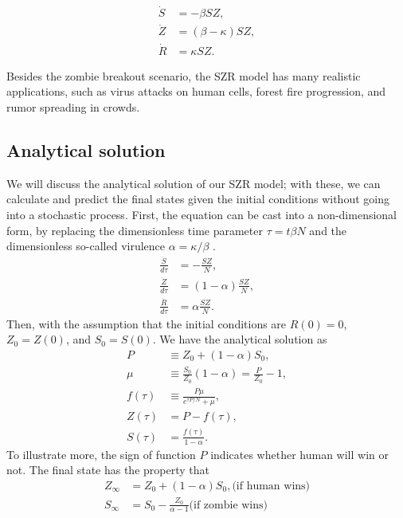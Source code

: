 \documentclass[11pt]{article}
\begin{document}
\begin{align}
    \dot{S} & = -\beta SZ,        \\
    \dot{Z} & = (\beta-\kappa)SZ, \\
    \dot{R} & = \kappa SZ.
\end{align}

Besides the zombie breakout scenario, the SZR model has many realistic applications, such as virus attacks on human cells, forest fire progression, and rumor spreading in crowds.

\subsection{Analytical solution}
\label{sec:analy}
We will discuss the analytical solution of our SZR model; with these, we can calculate and predict the final states given the initial conditions without going into a stochastic process. First, the equation can be cast into a non-dimensional form, by replacing the dimensionless time parameter $\tau=t\beta N$ and the dimensionless so-called virulence $\alpha=\kappa/\beta$ \cite{Gillespie}.
\begin{align}
    \frac{\dot{S}}{d\tau} & = - \frac{SZ}{N},         \\
    \frac{\dot{Z}}{d\tau} & = (1-\alpha)\frac{SZ}{N}, \\
    \frac{\dot{R}}{d\tau} & = \alpha\frac{SZ}{N}.
\end{align}
Then, with the assumption that the initial conditions are $R(0)=0$, $Z_0=Z(0)$, and $S_0=S(0)$. We have the analytical solution as
\begin{align}
    P       & \equiv Z_0 + (1-\alpha)S_0,                           \\
    \mu     & \equiv \frac{S_0}{Z_0}(1-\alpha) = \frac{P}{Z_0} - 1, \\
    f(\tau) & \equiv \frac{P\mu}{e^{\tau P/N}+\mu},                 \\
    Z(\tau) & = P - f(\tau),                                        \\
    S(\tau) & = \frac{f(\tau)}{1-\alpha}.
\end{align}
To illustrate more, the sign of function $P$ indicates whether human will win or not. The final state has the property that
\begin{align}
    Z_\infty & = Z_0 + (1-\alpha)S_0, \text{(if human wins)}       \\
    S_\infty & = S_0 -\frac{Z_0}{\alpha-1} \text{(if zombie wins)}
\end{align}
\end{document}
